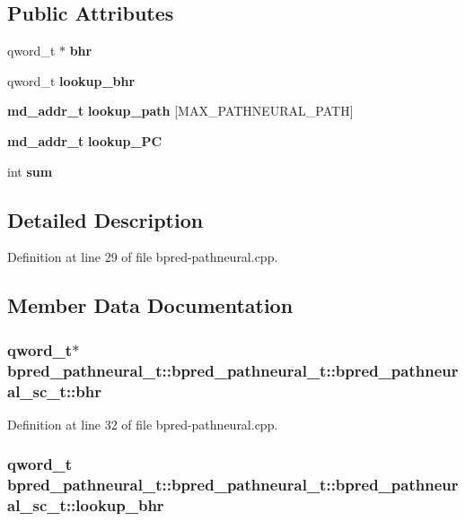 \subsection*{Public Attributes}
\begin{CompactItemize}
\item 
qword\_\-t $\ast$ {\bf bhr}
\item 
qword\_\-t {\bf lookup\_\-bhr}
\item 
{\bf md\_\-addr\_\-t} {\bf lookup\_\-path} [MAX\_\-PATHNEURAL\_\-PATH]
\item 
{\bf md\_\-addr\_\-t} {\bf lookup\_\-PC}
\item 
int {\bf sum}
\end{CompactItemize}


\subsection{Detailed Description}


Definition at line 29 of file bpred-pathneural.cpp.

\subsection{Member Data Documentation}
\subsubsection[{bhr}]{\setlength{\rightskip}{0pt plus 5cm}qword\_\-t$\ast$ bpred\_\-pathneural\_\-t::bpred\_\-pathneural\_\-t::bpred\_\-pathneural\_\-sc\_\-t::bhr}\label{classbpred__pathneural__t_1_1bpred__pathneural__sc__t_7770ab8e178d97499a62efa20fb5940d}




Definition at line 32 of file bpred-pathneural.cpp.
\subsubsection[{lookup\_\-bhr}]{\setlength{\rightskip}{0pt plus 5cm}qword\_\-t bpred\_\-pathneural\_\-t::bpred\_\-pathneural\_\-t::bpred\_\-pathneural\_\-sc\_\-t::lookup\_\-bhr}\label{classbpred__pathneural__t_1_1bpred__pathneural__sc__t_0cc822e69db8c1aff23a3ba979d653ec}




